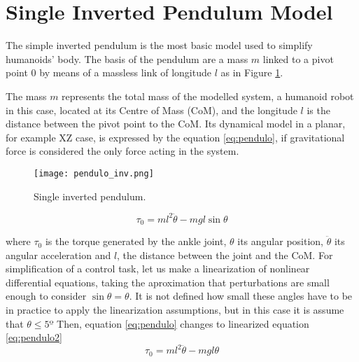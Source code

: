 \section{Single Inverted Pendulum Model}
The simple inverted pendulum is the most basic model used to simplify humanoids' body. The basis of the pendulum are a mass $m$ linked to a pivot point $0$ by means of a massless link of longitude $l$ as in Figure \ref{fig:pendulo_inv}.

The mass $m$ represents the total mass of the modelled system, a humanoid robot in this case, located at its Centre of Mass (CoM), and the longitude $l$ is the distance between the pivot point to the CoM. Its dynamical model in a planar, for example XZ case, is expressed by the equation \eqref{eq:pendulo}, if gravitational force is considered the only force acting in the system.

\begin{figure}
\centering
\texttt{[image: pendulo\_inv.png]}
\caption{Single inverted pendulum.}
\label{fig:pendulo_inv}
\end{figure}

\begin{equation}
\tau_0 = ml^2 \ddot{\theta} - mgl\sin\theta
\label{eq:pendulo}
\end{equation}

where $\tau_0$ is the torque generated by the ankle joint, $\theta$ its angular position, $\ddot{\theta}$ its angular acceleration and $l$, the distance between the joint and the CoM. For simplification of a control task, let us make a linearization of nonlinear differential equations, taking the aproximation that perturbations are small enough to consider  $\sin\theta = \theta$. It is not defined how small these angles have to be in practice to apply the linearization assumptions, but in this case it is assume that $\theta \leq 5º$ Then, equation \eqref{eq:pendulo} changes to linearized equation \eqref{eq:pendulo2}
\begin{equation}
\tau_0 = ml^2 \ddot{\theta} - mgl\theta
\label{eq:pendulo2}
\end{equation}


